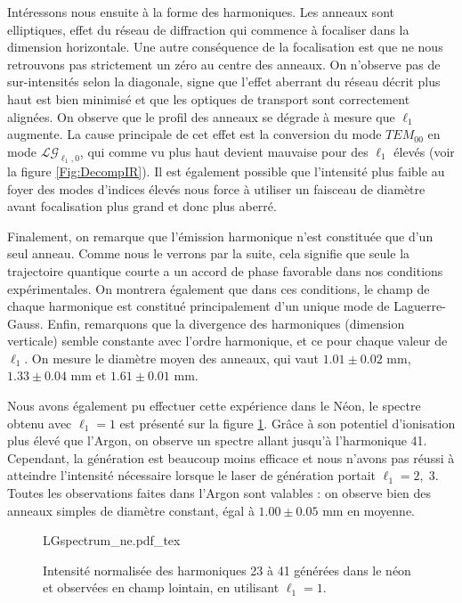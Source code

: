 Intéressons nous ensuite à la forme des harmoniques. Les anneaux sont elliptiques, effet du réseau de diffraction qui commence à focaliser dans la dimension horizontale. Une autre conséquence de la focalisation est que ne nous retrouvons pas strictement un zéro au centre des anneaux. On n'observe pas de sur-intensités selon la diagonale, signe que l'effet aberrant du réseau décrit plus haut est bien minimisé et que les optiques de transport sont correctement alignées.
On observe que le profil des anneaux se dégrade à mesure que $\ell_{1}$ augmente. La cause principale de cet effet est la conversion du mode $TEM_{00}$ en mode $\mathcal{LG}_{\ell_{1},0}$, qui comme vu plus haut devient mauvaise pour des $\ell_1$ élevés (voir la figure \ref{Fig:DecompIR}). Il est également possible que l'intensité plus faible au foyer des modes d'indices élevés nous force à utiliser un faisceau de diamètre avant focalisation plus grand et donc plus aberré.

Finalement, on remarque que l'émission harmonique n'est constituée que d'un seul anneau. Comme nous le verrons par la suite, cela signifie que seule la trajectoire quantique courte a un accord de phase favorable dans nos conditions expérimentales. On montrera également que dans ces conditions, le champ de chaque harmonique est constitué principalement d'un unique mode de Laguerre-Gauss. Enfin, remarquons que la divergence des harmoniques (dimension verticale) semble constante avec l'ordre harmonique, et ce pour chaque valeur de $\ell_{1}$. On mesure le diamètre moyen des anneaux, qui vaut $1.01\pm 0.02$ mm, $1.33\pm 0.04$ mm et $1.61\pm 0.01$ mm. 

Nous avons également pu effectuer cette expérience dans le Néon, le spectre obtenu avec $\ell_1=1$ est présenté sur la figure \ref{Fig:LGSpectrumNe}. Grâce à son potentiel d'ionisation plus élevé que l'Argon, on observe un spectre allant jusqu'à l'harmonique 41. Cependant, la génération est beaucoup moins efficace et nous n'avons pas réussi à atteindre l'intensité nécessaire lorsque le laser de génération portait $\ell_1=2,\;3$. Toutes les observations faites dans l'Argon sont valables : on observe bien des anneaux simples de diamètre constant, égal à $1.00\pm 0.05$ mm en moyenne.

\begin{figure}[!ht]
\centering
\def\svgwidth{1\columnwidth}
{LGspectrum_ne.pdf_tex}
\caption{Intensité normalisée des harmoniques 23 à 41 générées dans le néon et observées en champ lointain, en utilisant $\ell_{1} = 1$.}
\label{Fig:LGSpectrumNe}
\end{figure}

